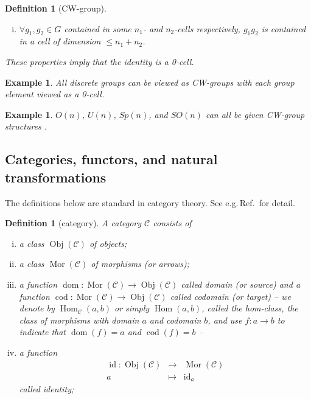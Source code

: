 \documentclass[sort&compress]{elsarticle}
\theoremstyle{theoremstyle}
\theoremstyle{framedtheoremstyle}
\theoremstyle{definitionstyle}
\newtheorem{dfn}[nul]{Definition}%
\theoremstyle{definitionstyle}
\theoremstyle{definitionstyle}
\theoremstyle{definitionstyle}
\newtheorem{exm}[nul]{Example}
\theoremstyle{nameddefinitionstyle}
\theoremstyle{framednameddefinitionstyle}
\theoremstyle{proofstyle}
\theoremstyle{definitionstyle}
\newcommand{\fromto}{\rightarrow}
\newcommand{\C}{\mathcal{C}}
\DeclareMathOperator{\identity}{id}
\DeclareMathOperator{\Obj}{Obj}
\DeclareMathOperator{\Mor}{Mor}
\DeclareMathOperator{\Hom}{Hom}
\DeclareMathOperator{\dom}{dom}
\DeclareMathOperator{\cod}{cod}
\newcommand{\paren}[1]{\left( #1 \right)}
\begin{document}
\begin{appendices}
\begin{dfn}[CW-group]
\begin{enumerate}[(i)]
\item $\forall g_1, g_2\in G$ contained in some $n_1$- and $n_2$-cells respectively, $g_1g_2$ is contained in a cell of dimension $\leq n_1+n_2$.
\end{enumerate}
These properties imply that the identity is a 0-cell.
\end{dfn}

\begin{exm}
All discrete groups can be viewed as CW-groups with each group element viewed as a 0-cell.
\end{exm}

\begin{exm}
$O(n)$, $U(n)$, $Sp(n)$, and $SO(n)$ can all be given CW-group structures \cite{SteenrodEpstein}.
\end{exm}






\subsection{Categories, functors, and natural transformations\label{subapp:categories_functors_natural_transformations}}

The definitions below are standard in category theory. See e.g.\,Ref.\,\cite{MacLane} for detail.

\begin{dfn}[category]
A category $\C$ consists of
\begin{enumerate}[(i)]
\item a class $\Obj(\C)$ of objects;

\item a class $\Mor(\C)$ of morphisms (or arrows);

\item a function $\dom: \Mor(\C) \fromto \Obj(\C)$ called domain (or source) and a function $\cod: \Mor(\C) \fromto \Obj(\C)$ called codomain (or target)
--
we denote by $\Hom_{\C}\paren{a,b}$ or simply $\Hom\paren{a,b}$, called the hom-class, the class of morphisms with domain $a$ and codomain $b$, and use $f: a \fromto b$ to indicate that $\dom(f) = a$ and $\cod(f) = b$ --

\item a function
\begin{eqnarray}
\identity: \Obj(\C) &\fromto& \Mor(\C) \nonumber \\
a &\mapsto& \identity_a
\end{eqnarray}
called identity;


\end{enumerate}
\end{dfn}
\end{appendices}
\end{document}
